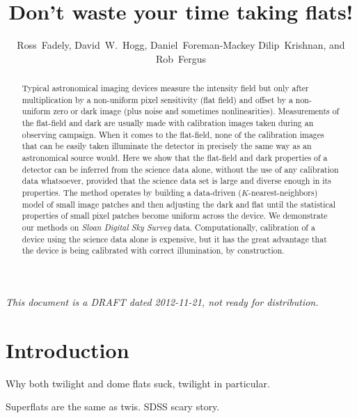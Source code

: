 \documentclass[12pt,preprint,pdftex]{aastex}
\newcommand{\project}[1]{\textsl{#1}}
\begin{document}
\title{Don't waste your time taking flats!}
\author{
  Ross~Fadely,
  David~W.~Hogg,
  Daniel~Foreman-Mackey
  Dilip~Krishnan, and
  Rob~Fergus
}

\begin{abstract}
Typical astronomical imaging devices measure the intensity field but
only after multiplication by a non-uniform pixel sensitivity (flat
field) and offset by a non-uniform zero or dark image (plus noise and
sometimes nonlinearities).  Measurements of the flat-field and dark
are usually made with calibration images taken during an observing
campaign.  When it comes to the flat-field, none of the calibration
images that can be easily taken illuminate the detector in precisely
the same way as an astronomical source would.  Here we show that the
flat-field and dark properties of a detector can be inferred from the
science data alone, without the use of any calibration data
whatsoever, provided that the science data set is large and diverse
enough in its properties.  The method operates by building a
data-driven ($K$-nearest-neighbors) model of small image patches and
then adjusting the dark and flat until the statistical properties of
small pixel patches become uniform across the device.  We demonstrate
our methods on \project{Sloan Digital Sky Survey} data.
Computationally, calibration of a device using the science data alone
is expensive, but it has the great advantage that the device is being
calibrated with correct illumination, by construction.
\end{abstract}

\noindent
\textsl{This document is a DRAFT dated 2012-11-21, not ready for distribution.}

\section{Introduction}

Why both twilight and dome flats suck, twilight in particular.

Superflats are the same as twis.  SDSS scary story.
\end{document}
